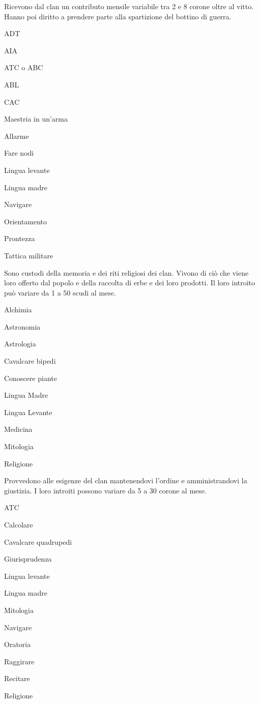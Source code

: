 
Ricevono dal clan un contributo mensile variabile tra 2 e 8 corone
oltre al vitto. Hanno poi diritto a prendere parte alla spartizione
del bottino di guerra.

\begin{abilist}
\item ADT
\item AIA
\item ATC o ABC
\item ABL
\item CAC
\item Maestria in un'arma
\item Allarme
\item Fare nodi
\item Lingua levante
\item Lingua madre
\item Navigare
\item Orientamento
\item Prontezza
\item Tattica militare
\end{abilist}


Sono custodi della memoria e dei riti religiosi dei clan. Vivono di
ci\`o che viene loro offerto dal popolo e della raccolta di erbe e
dei loro prodotti.  Il loro introito pu\`o variare da 1 a 50 scudi
al mese.

\begin{abilist}
\item Alchimia
\item Astronomia
\item Astrologia
\item Cavalcare bipedi
\item Conoscere piante
\item Lingua Madre
\item Lingua Levante
\item Medicina
\item Mitologia
\item Religione
\end{abilist}


Provvedono alle esigenze del clan mantenendovi l'ordine e
amministrandovi la giustizia. I loro introiti possono variare da 5 a
30 corone al mese.

\begin{abilist}
\item ATC
\item Calcolare
\item Cavalcare quadrupedi
\item Giurisprudenza
\item Lingua levante 
\item Lingua madre
\item Mitologia 
\item Navigare
\item Oratoria
\item Raggirare
\item Recitare
\item Religione
\end{abilist}

